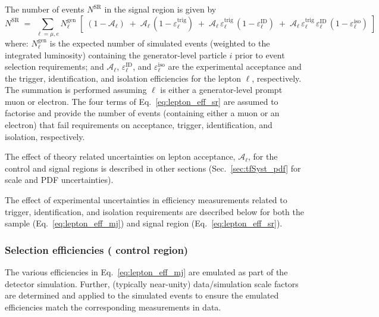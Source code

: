 The number of events $N^\textrm{SR}$ in the signal region is given by
\begin{equation}
  \label{eq:lepton_eff_sr}
  N^\textrm{SR} 
  \; = \; 
  \sum_{\ell = \mu,e} 
  N^\textrm{gen}_\ell 
  \; [ \;
  (1-\mathcal{A}_\ell)
  \; + \;
  \mathcal{A}_\ell \,
  (1-\varepsilon^\textrm{trig}_\ell)
  \; + \;
  \mathcal{A}_\ell \,
  \varepsilon^\textrm{trig}_\ell \,
  (1-\varepsilon^\textrm{ID}_\ell)
  \; + \;
  \mathcal{A}_\ell \,
  \varepsilon^\textrm{trig}_\ell \,
  \varepsilon^\textrm{ID}_\ell \,
  (1-\varepsilon^\textrm{iso}_\ell)
  \; ]
\end{equation}
where: $N^\textrm{gen}_\ell$ is the expected number of simulated
events (weighted to the integrated luminosity) containing the
generator-level particle $i$ prior to event selection requirements;
and $\mathcal{A}_\ell$, $\varepsilon^\textrm{ID}_\ell$, and
$\varepsilon^\textrm{iso}_\ell$ are the experimental acceptance and
the trigger, identification, and isolation efficiencies for the lepton
$\ell$, respectively. The summation is performed assuming $\ell$ is
either a generator-level prompt muon or electron. The four terms of
Eq.~\ref{eq:lepton_eff_sr} are assumed to factorise and provide
the number of events (containing either a muon or an electron) that
fail requirements on acceptance, trigger, identification, and
isolation, respectively.

The effect of theory related uncertainties on lepton acceptance,
$\mathcal{A}_\ell$, for the \mj control and signal regions is
described in other sections (\eg Sec.~\ref{sec:tfSyst_pdf} for scale
and PDF uncertainties).

The effect of experimental uncertainties in efficiency measurements
related to trigger, identification, and isolation requirements are
dsecribed below for both the \mj sample (Eq.~\ref{eq:lepton_eff_mj})
and signal region (Eq.~\ref{eq:lepton_eff_sr}).

\subsubsection*{Selection efficiencies (\texorpdfstring{\mj}{mu+jets} control region)}

The various efficiencies in Eq.~\ref{eq:lepton_eff_mj} are emulated as
part of the detector simulation. Further, (typically near-unity)
data/simulation scale factors are determined and applied to the
simulated events to ensure the emulated efficiencies match the
corresponding measurements in data.

